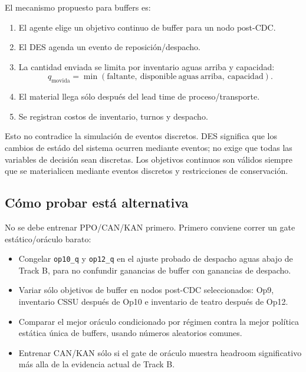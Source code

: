 \documentclass[11pt]{article}
\begin{document}
El mecanismo propuesto para buffers es:

\begin{enumerate}[leftmargin=1.5em]
  \item El agente elige un objetivo continuo de buffer para un nodo post-CDC.
  \item El DES agenda un evento de reposición/despacho.
  \item La cantidad enviada se limita por inventario aguas arriba y capacidad:
  \[
    q_{\mathrm{movida}} =
    \min(\mathrm{faltante},\ \mathrm{disponible\ aguas\ arriba},\ \mathrm{capacidad}).
  \]
  \item El material llega sólo después del lead time de proceso/transporte.
  \item Se registran costos de inventario, turnos y despacho.
\end{enumerate}

Esto no contradice la simulación de eventos discretos. DES significa que los
cambios de estádo del sistema ocurren mediante eventos; no exige que todas las
variables de decisión sean discretas. Los objetivos continuos son válidos
siempre que se materialicen mediante eventos discretos y restricciones de
conservación.

\subsection*{Cómo probar está alternativa}

No se debe entrenar PPO/CAN/KAN primero. Primero conviene correr un gate
estático/oráculo barato:

\begin{itemize}[leftmargin=1.5em]
  \item Congelar \texttt{op10\_q} y \texttt{op12\_q} en el ajuste probado de
  despacho aguas abajo de Track B, para no confundir ganancias de buffer con
  ganancias de despacho.
  \item Variar sólo objetivos de buffer en nodos post-CDC seleccionados: Op9,
  inventario CSSU después de Op10 e inventario de teatro después de Op12.
  \item Comparar el mejor oráculo condicionado por régimen contra la mejor
  política estática única de buffers, usando números aleatorios comunes.
  \item Entrenar CAN/KAN sólo si el gate de oráculo muestra headroom
  significativo más alla de la evidencia actual de Track B.
\end{itemize}
\end{document}
